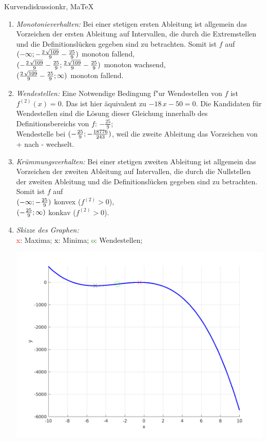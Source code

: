 \begin{MAufgabe}{Kurvendiskussion}{kr, MaTeX}
\begin{enumerate}
 \item \emph{Monotonieverhalten:} 
 Bei einer stetigen ersten Ableitung ist allgemein das Vorzeichen der ersten Ableitung auf Intervallen, die durch die Extremstellen und die Definitionsl\"ucken gegeben sind zu betrachten. Somit ist $f$ auf \\ 
 $(-\infty; - \frac{2\, \sqrt{109}}{9} - \frac{25}{9})$ monoton fallend, \\ 
 $( - \frac{2\, \sqrt{109}}{9} - \frac{25}{9};\frac{2\, \sqrt{109}}{9} - \frac{25}{9})$ monoton  wachsend, \\ 
 $(\frac{2\, \sqrt{109}}{9} - \frac{25}{9}; \infty)$ monoton fallend. \\ 
 \item \emph{Wendestellen:} 
 Eine Notwendige Bedingung f"ur Wendestellen von $f$ ist $f^{(2)}(x)=0$. 
 Das ist hier \"aquivalent zu $ - 18\, x - 50=0$. 
 Die Kandidaten f\"ur Wendestellen sind die L\"osung dieser Gleichung innerhalb des Definitionsbereichs von $f$: $- \frac{25}{9}$; \\ 
 Wendestelle bei $(- \frac{25}{9};- \frac{18776}{243})$, weil die zweite Ableitung das Vorzeichen von + nach - wechselt. \\ 
 \item \emph{Kr\"ummungsverhalten:} 
 Bei einer stetigen zweiten Ableitung ist allgemein das Vorzeichen der zweiten Ableitung auf Intervallen, die durch die Nullstellen der zweiten Ableitung und die Definitionsl\"ucken gegeben sind zu betrachten. 
 Somit ist $f$ auf \\ 
 $(-\infty ;- \frac{25}{9})$  konvex ($f^{(2)}>0$), \\ 
 $(- \frac{25}{9}; \infty)$  konkav ($f^{(2)}>0$). \\ 
 \item \emph{Skizze des Graphen:} \\ 
 {\textcolor{red} x}: Maxima; {\textcolor{black} x}: Minima; {\textcolor{green} o}: Wendestellen; 
  \begin{center}
  \includegraphics[width=0.8\linewidth]{Abb_zur_Ag_autogenerated_fractions_29.png} \end{center}
  
 \end{enumerate}
 \else\relax\fi
  \end{MAufgabe}